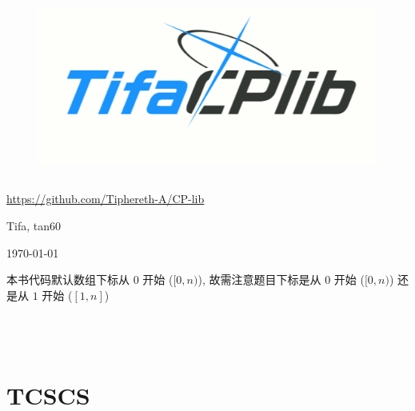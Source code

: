 \documentclass[10pt]{ICPCnotebook}
\begin{document}
\begin{titlepage}
    \vspace*{3cm}
    \begin{figure}[H]
        \centering
        \includegraphics[height=6cm]{img/cplib-logo-ba-style.png}
    \end{figure}

    \vspace*{6cm}
    \begin{center}
        \large \url{https://github.com/Tiphereth-A/CP-lib}
    \end{center}

    \vspace*{0.3cm}
    \begin{center}
        Tifa, tan60
    \end{center}

    \vspace*{0.2cm}
    \begin{center}
        \today
    \end{center}
\end{titlepage}

\pagestyle{plain}


本书代码默认数组下标从 \(0\) 开始 (\([0, n)\)), 故需注意题目下标是从 \(0\) 开始 (\([0, n)\)) 还是从 \(1\) 开始 (\([1, n]\))

\inputminted{cpp}{src/src/main.cpp}

\inputminted{cpp}{src/src/test.cpp}

\inputminted{yaml}{src/src/.clang-format}

\inputminted{bash}{src/src/run.sh}

\newpage
\begin{multicols}{2}
    \tableofcontents
\end{multicols}

\newpage
\pagestyle{fancy}
\setcounter{page}{1}




\section{TCSCS}
\label{sec:theoretical-computer-science-cheat-sheet}





\end{document}
